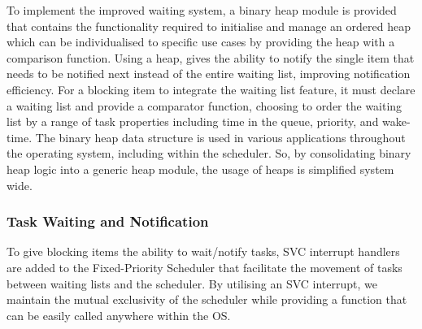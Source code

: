 To implement the improved waiting system, a binary heap module is provided that contains the functionality required to initialise and manage an ordered heap which can be individualised to specific use cases by providing the heap with a comparison function. Using a heap, gives the ability to notify the single item that needs to be notified next instead of the entire waiting list, improving notification efficiency. \hfill\newline
For a blocking item to integrate the waiting list feature, it must declare a waiting list and provide a comparator function, choosing to order the waiting list by a range of task properties including time in the queue, priority, and wake-time. \hfill\newline
The binary heap data structure is used in various applications throughout the operating system, including within the scheduler. So, by consolidating binary heap logic into a generic heap module, the usage of heaps is simplified system wide.

\subsubsection{Task Waiting and Notification}
To give blocking items the ability to wait/notify tasks, SVC interrupt handlers are added to the Fixed-Priority Scheduler that facilitate the movement of tasks between waiting lists and the scheduler. By utilising an SVC interrupt, we maintain the mutual exclusivity of the scheduler while providing a function that can be easily called anywhere within the OS.